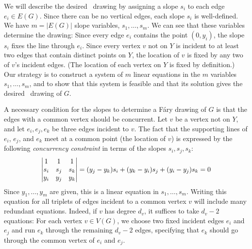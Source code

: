 
We will describe the desired \Fary\ drawing by assigning a slope $s_i$
to each edge $e_i\in E(G)$.   Since there can be no vertical edges,
each slope $s_i$ is well-defined. We have $m=|E(G)|$ slope variables,
$s_1,\ldots,s_m$. 
We can see that these variables determine the drawing:
 Since every edge $e_i$ contains the point $(0,y_i)$,
the slope $s_i$ fixes the line through $e_i$.  Since every vertex $v$
not on $Y$ is incident to at least two edges that contain distinct points
on $Y$, the location of $v$ is fixed by any two of $v$'s incident edges.  
(The location of each vertex on
$Y$ is fixed by definition.)  Our strategy is to construct a
system of $m$ linear equations in the $m$ variables $s_1,\ldots,s_m$,
and to show that
this system is feasible and that its solution gives the desired \Fary\
drawing of $G$.

A necessary condition for the slopes to determine a F\'ary drawing of
$G$ is that the %
edges 
with a common vertex should be concurrent. Let $v$ be a vertex 
not on $Y$, and let $e_i, e_j, e_k$ be three edges incident to $v$.
The fact that the supporting lines of $e_i$, $e_j$, and $e_k$
meet at a common point (the location of $v$) is expressed by the following
\emph{concurrency constraint} in terms of the slopes $s_i,s_j,s_k$:
\begin{equation}\eqlabel{slope0} 
\left|
\begin{matrix}
1&1&1\\
s_i&s_j&s_k\\
y_i&y_j&y_k
\end{matrix}
\right|=
({y_j-y_k}) s_i + ({y_k-y_i}) s_j 
+ ({y_i-y_j})s_k  = 0
\end{equation}
Since $y_1,\ldots,y_m$ are given, this is a linear equation
in $s_1,\ldots,s_m$.
Writing this equation for all triplets of edges incident to a common
vertex $v$ will include many redundant equations. Indeed,
if $v$ has degree $d_v$,
it suffices to take $d_v-2$ equations: For each vertex $v\in V(G)$, we choose two fixed
incident edges $e_i$ and $e_j$ and run $e_k$ through the remaining
$d_v-2$ edges, specifying that $e_k$ should go through the common vertex
of $e_i$ and $e_j$.

